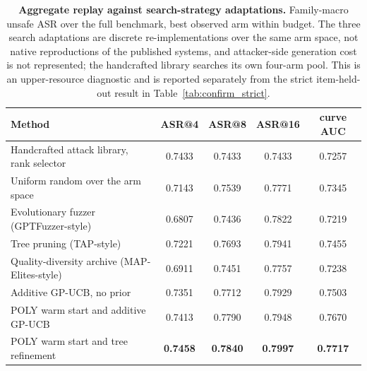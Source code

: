 \begin{table}[t]
\centering
\small
\caption{\textbf{Aggregate replay against search-strategy adaptations.} Family-macro unsafe ASR over
the full benchmark, best observed arm within budget. The three search adaptations are discrete
re-implementations over the same arm space, not native reproductions of the published systems, and
attacker-side generation cost is not represented; the handcrafted library searches its own four-arm
pool. This is an upper-resource diagnostic and is reported separately from the strict item-held-out
result in Table~\ref{tab:confirm_strict}.}
\label{tab:confirm_endtoend}
\begin{tabular}{lcccc}
\toprule
Method & ASR@4 & ASR@8 & ASR@16 & curve AUC \\
\midrule
Handcrafted attack library, rank selector & 0.7433 & 0.7433 & 0.7433 & 0.7257 \\
Uniform random over the arm space & 0.7143 & 0.7539 & 0.7771 & 0.7345 \\
Evolutionary fuzzer (GPTFuzzer-style) & 0.6807 & 0.7436 & 0.7822 & 0.7219 \\
Tree pruning (TAP-style) & 0.7221 & 0.7693 & 0.7941 & 0.7455 \\
Quality-diversity archive (MAP-Elites-style) & 0.6911 & 0.7451 & 0.7757 & 0.7238 \\
Additive GP-UCB, no prior & 0.7351 & 0.7712 & 0.7929 & 0.7503 \\
POLY warm start and additive GP-UCB & 0.7413 & 0.7790 & 0.7948 & 0.7670 \\
POLY warm start and tree refinement & \textbf{0.7458} & \textbf{0.7840} & \textbf{0.7997} & \textbf{0.7717} \\
\bottomrule
\end{tabular}
\end{table}

